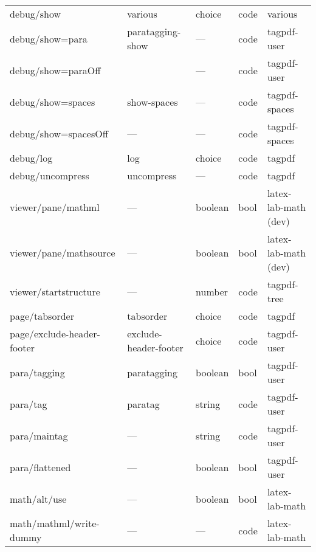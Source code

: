 \begin{tabular}{lllll}
debug/show       &various          &choice            &code  & various \\ 
debug/show=para  & paratagging-show&    ---           &code  & tagpdf-user\\
debug/show=paraOff&                &    ---           &code  & tagpdf-user\\
debug/show=spaces & show-spaces    &    ---           &code  & tagpdf-spaces\\
debug/show=spacesOff& ---          &    ---           &code  & tagpdf-spaces\\
debug/log        & log             & choice           &code  & tagpdf \\
debug/uncompress & uncompress      &  ---             &code  & tagpdf\\[4pt]\midrule  
viewer/pane/mathml &  ---          &  boolean         &bool  &latex-lab-math (dev)\\
viewer/pane/mathsource& ---        &boolean           &bool  &latex-lab-math (dev)\\
viewer/startstructure & ---        &number            &code  &tagpdf-tree \\[4pt]\midrule
page/tabsorder  &tabsorder         & choice          & code & tagpdf\\   
page/exclude-header-footer & exclude-header-footer &choice & code &tagpdf-user\\[4pt]\midrule
para/tagging     &paratagging      &boolean          &bool  &tagpdf-user\\
para/tag         &paratag          &string           &code  &tagpdf-user\\
para/maintag     &---              &string           &code  &tagpdf-user\\
para/flattened   &---              &boolean          &bool  &tagpdf-user\\[4pt]\midrule
math/alt/use     &---              &boolean          &bool  &latex-lab-math\\
math/mathml/write-dummy & ---      &---              &code  &latex-lab-math\\

\end{tabular}
